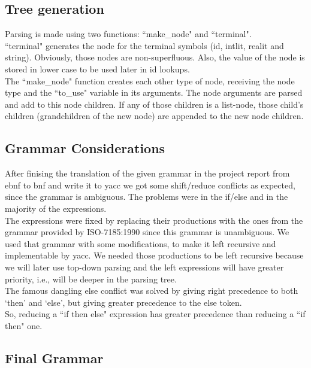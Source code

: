 \documentclass[12pt]{article}
\begin{document}
\subsection{Tree generation}

Parsing is made using two functions: ``make\_node" and ``terminal". \\
``terminal" generates the node for the terminal symbols (id, intlit, realit and string). Obviously, those nodes are non-superfluous. Also, the value of the node is stored in lower case to be used later in id lookups.\\
The ``make\_node" function creates each other type of node, receiving the node type and the ``to\_use" variable in its arguments. The node arguments are parsed and add to this node children. If any of those children is a list-node, those child's children (grandchildren of the new node) are appended to the new node children.

\subsection{Grammar Considerations}

After finising the translation of the given grammar in the project report from ebnf to bnf and write it to yacc we got some shift/reduce conflicts as expected, since the grammar is ambiguous. The problems were in the if/else and in the majority of the expressions. \\
The expressions were fixed by replacing their productions with the ones from the grammar provided by ISO-7185:1990 since this grammar is unambiguous. We used that grammar with some modifications, to make it left recursive and implementable by yacc. We needed those productions to be left recursive because we will later use top-down parsing and the left expressions will have greater priority, i.e., will be deeper in the parsing tree. \\
The famous dangling else conflict was solved by giving right precedence to both `then' and `else', but giving greater precedence to the else token. \\
So, reducing a ``if then else" expression has greater precedence than reducing a ``if then" one. \\

\subsection{Final Grammar}
\end{document}
